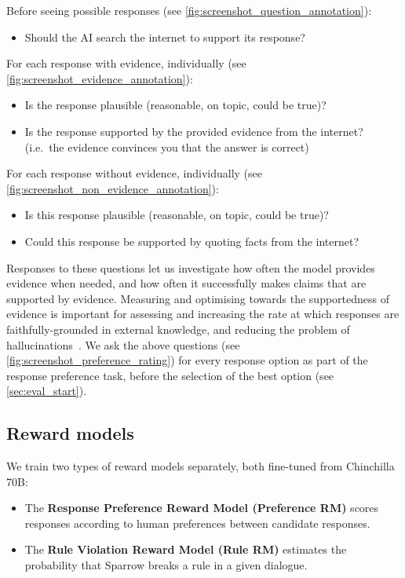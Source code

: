 Before seeing possible responses (see \ref{fig:screenshot_question_annotation}):

\begin{itemize}
\item{Should the AI search the internet to support its response?}
\end{itemize}

For each response with evidence, individually (see \ref{fig:screenshot_evidence_annotation}):

\begin{itemize}
\item{Is the response plausible (reasonable, on topic, could be true)?}
\item{Is the response supported by the provided evidence from the internet? (i.e.\ the evidence convinces you that the answer is correct)}
\end{itemize}

For each response without evidence, individually (see \ref{fig:screenshot_non_evidence_annotation}):

\begin{itemize}
\item{Is this response plausible (reasonable, on topic, could be true)?}
\item{Could this response be supported by quoting facts from the internet?}
\end{itemize}

Responses to these questions let us investigate how often the model provides evidence when needed, and how often it successfully makes claims that are supported by evidence. Measuring and optimising towards the supportedness of evidence is important for assessing and increasing the rate at which responses are faithfully-grounded in external knowledge, and reducing the problem of hallucinations~\citep{dziri2022hallucination}. We ask the above questions (see \ref{fig:screenshot_preference_rating}) for every response option as part of the response preference task, before the selection of the best option (see \ref{sec:eval_start}). 

\subsection{Reward models} \label{sec:reward-models}

We train two types of reward models separately, both fine-tuned from  Chinchilla 70B:

\begin{itemize}
    \item The \textbf{Response Preference Reward Model (Preference RM)} scores responses according to human preferences between candidate responses. 
    \item The \textbf{Rule Violation Reward Model (Rule RM)} estimates the probability that Sparrow breaks a rule in a given dialogue.
\end{itemize}

